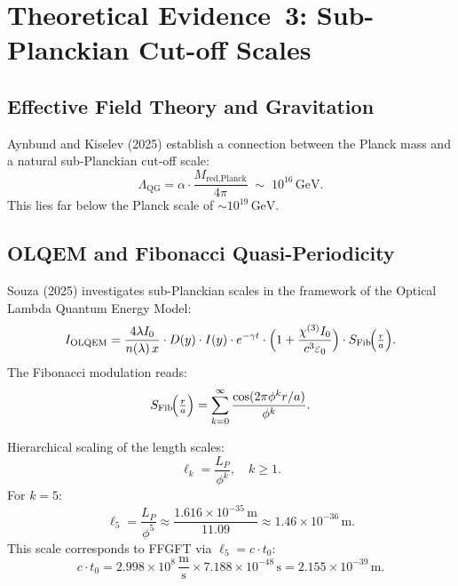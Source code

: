 \section{Theoretical Evidence~3: Sub-Planckian Cut-off Scales}

\subsection{Effective Field Theory and Gravitation}

Aynbund and Kiselev (2025) \cite{Aynbund2025} establish a connection
between the Planck mass and a natural sub-Planckian cut-off scale:
\begin{equation}
  \Lambda_{\text{QG}} = \alpha \cdot \frac{M_{\text{red,Planck}}}{4\pi}
  \;\sim\; 10^{16}\,\text{GeV}.
\end{equation}
This lies far below the Planck scale of $\sim 10^{19}\,\text{GeV}$.

\subsection{OLQEM and Fibonacci Quasi-Periodicity}

Souza (2025) \cite{subPlanck2025} investigates sub-Planckian scales in
the framework of the Optical Lambda Quantum Energy Model:
\begin{equation}
  I_{\text{OLQEM}}
  = \frac{4\lambda I_0}{n(\lambda)\,x} \cdot D(y) \cdot I(y)
    \cdot e^{-\gamma t}
    \cdot \Bigl(1+\frac{\chi^{(3)}I_0}{c^3\varepsilon_0}\Bigr)
    \cdot S_{\text{Fib}}\!\Bigl(\tfrac{r}{a}\Bigr).
\end{equation}
The Fibonacci modulation reads:
\begin{equation}
  S_{\text{Fib}}\!\Bigl(\tfrac{r}{a}\Bigr)
  = \sum_{k=0}^{\infty} \frac{\cos(2\pi\phi^k r/a)}{\phi^k}.
\end{equation}

Hierarchical scaling of the length scales:
\begin{equation}
  \ell_k = \frac{L_P}{\phi^k},\quad k \ge 1.
\end{equation}
For $k=5$:
\begin{equation}
  \ell_5 = \frac{L_P}{\phi^5}
         \approx \frac{1.616 \times 10^{-35}\,\text{m}}{11.09}
         \approx 1.46 \times 10^{-36}\,\text{m}.
\end{equation}
This scale corresponds to FFGFT via $\ell_5 = c\cdot t_0$:
\begin{equation}
  c \cdot t_0
  = 2.998 \times 10^8\,\frac{\text{m}}{\text{s}}
    \times 7.188 \times 10^{-48}\,\text{s}
  = 2.155 \times 10^{-39}\,\text{m}.
\end{equation}

